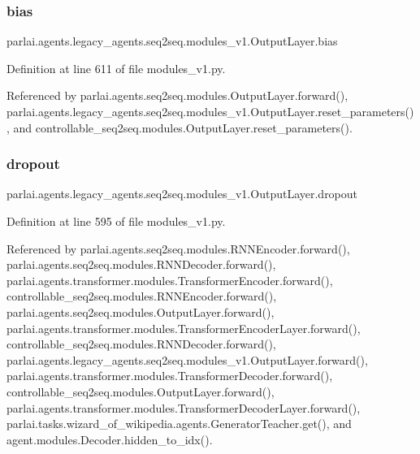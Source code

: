 \subsubsection{\texorpdfstring{bias}{bias}}
{\footnotesize\ttfamily parlai.\+agents.\+legacy\+\_\+agents.\+seq2seq.\+modules\+\_\+v1.\+Output\+Layer.\+bias}



Definition at line 611 of file modules\+\_\+v1.\+py.



Referenced by parlai.\+agents.\+seq2seq.\+modules.\+Output\+Layer.\+forward(), parlai.\+agents.\+legacy\+\_\+agents.\+seq2seq.\+modules\+\_\+v1.\+Output\+Layer.\+reset\+\_\+parameters(), and controllable\+\_\+seq2seq.\+modules.\+Output\+Layer.\+reset\+\_\+parameters().

\mbox{\label{classparlai_1_1agents_1_1legacy__agents_1_1seq2seq_1_1modules__v1_1_1OutputLayer_ad3c1ff9eaf45681a40e70c0b769e33b3}} 
\subsubsection{\texorpdfstring{dropout}{dropout}}
{\footnotesize\ttfamily parlai.\+agents.\+legacy\+\_\+agents.\+seq2seq.\+modules\+\_\+v1.\+Output\+Layer.\+dropout}



Definition at line 595 of file modules\+\_\+v1.\+py.



Referenced by parlai.\+agents.\+seq2seq.\+modules.\+R\+N\+N\+Encoder.\+forward(), parlai.\+agents.\+seq2seq.\+modules.\+R\+N\+N\+Decoder.\+forward(), parlai.\+agents.\+transformer.\+modules.\+Transformer\+Encoder.\+forward(), controllable\+\_\+seq2seq.\+modules.\+R\+N\+N\+Encoder.\+forward(), parlai.\+agents.\+seq2seq.\+modules.\+Output\+Layer.\+forward(), parlai.\+agents.\+transformer.\+modules.\+Transformer\+Encoder\+Layer.\+forward(), controllable\+\_\+seq2seq.\+modules.\+R\+N\+N\+Decoder.\+forward(), parlai.\+agents.\+legacy\+\_\+agents.\+seq2seq.\+modules\+\_\+v1.\+Output\+Layer.\+forward(), parlai.\+agents.\+transformer.\+modules.\+Transformer\+Decoder.\+forward(), controllable\+\_\+seq2seq.\+modules.\+Output\+Layer.\+forward(), parlai.\+agents.\+transformer.\+modules.\+Transformer\+Decoder\+Layer.\+forward(), parlai.\+tasks.\+wizard\+\_\+of\+\_\+wikipedia.\+agents.\+Generator\+Teacher.\+get(), and agent.\+modules.\+Decoder.\+hidden\+\_\+to\+\_\+idx().


